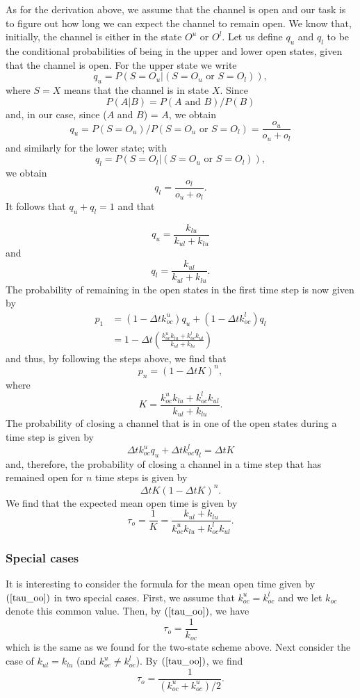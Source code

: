 As for the derivation above, we assume that the channel is open and
our task is to figure out how long we can expect the channel to remain open. We
know that, initially, the channel is either in the state $O^{u}$ or
$O^{l}$. Let us define $q_u$ and $q_l$ to be the conditional 
probabilities of being in the upper and lower open states, given that the channel is open. For the upper state we write
\[ q_u = P(S=O_u | (S={O_u} \mbox{\ or\ } S={O_l})), \]
where $S=X$ means that the channel is in state $X$.
Since
\[ P(A|B) = P(A \mbox{\ and\ } B)/P(B) \]
 and, in our case, since ($A$ and $B$) = $A$, we obtain
\[ q_u = P(S=O_u)/P(S={O_u} \mbox{\ or\ } S={O_l}) = \frac{o_u}{o_u+o_l} \]
and similarly for the lower state; with
\[ q_l = P(S=O_l | (S={O_u} \mbox{\ or\ } S={O_l})), \]
we obtain
\[ q_l  = \frac{o_l}{o_u+o_l}.\]
It follows that $q_u + q_l = 1$ and that

\[
q_{u}=\frac{k_{lu}}{k_{ul}+k_{lu}}%
\]
and%
\[
q_{l}=\frac{k_{ul}}{k_{ul}+k_{lu}}.
\]
The probability of remaining in the open states in the first time step is now given
by%
\begin{align*}
p_{1}  & =\left(  1-\Delta tk_{oc}^{u}\right)  q_{u}+\left(  1-\Delta
tk_{oc}^{l}\right)  q_{l}\\
& =1-\Delta t\left(  \frac{k_{oc}^{u}k_{lu}+k_{oc}^{l}k_{ul}}{k_{ul}+k_{lu}%
}\right)  
\end{align*}
and thus, by following the steps above, we find that%
\[
p_{n}=\left(  1-\Delta tK\right)  ^{n},
\]
where%
\[
K=\frac{k_{oc}^{u}k_{lu}+k_{oc}^{l}k_{ul}}{k_{ul}+k_{lu}}.
\]
The probability of closing a channel that is in one of the open states during
a time step is given by%
\[
\Delta tk_{oc}^{u}q_{u}+\Delta tk_{oc}^{l}q_{l}=\Delta tK
\]
and, therefore, the probability of closing a channel in a time step that has
remained open for $n$ time steps is given by%
\[
\Delta tK\left(  1-\Delta tK\right)^{n}.%
\]
We find  that the expected mean open time is given by%
\begin{equation}
\tau_{o}=\frac{1}{K}=\frac{k_{ul}+k_{lu}}{k_{oc}^{u}k_{lu}+k_{oc}^{l}k_{ul}}. \label{tau_oo}
\end{equation}

\subsubsection{Special cases}

It is interesting to consider the formula  for the mean open time given 
by $(\ref{tau_oo})$ in two special cases. First, we assume that 
$k^u_{oc}=k^l_{oc}$  and we let $k_{oc}$ denote this common value. Then, by $(\ref{tau_oo})$, we have 
\begin{equation*}
\tau_{o}=\frac{1}{k_{oc}}
\end{equation*}
which is the same as we found for the two-state scheme above. Next consider the case of $k_{ul}=k_{lu}$  (and 
$k^u_{oc}\not=k^l_{oc}$). By $(\ref{tau_oo})$, we find 
\begin{equation}
\tau_{o}=\frac{1}{(k_{oc}^{u}+k_{oc}^{u})/2}. \label{tau_ooo}
\end{equation}


